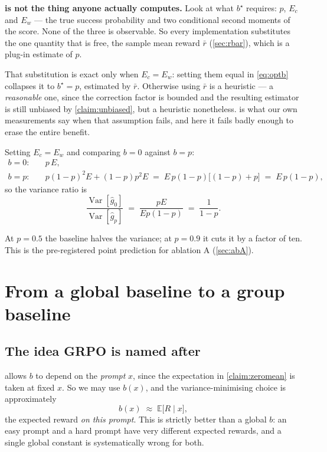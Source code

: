 \documentclass[11pt,letterpaper]{article}
\theoremstyle{definition}
\newcommand{\E}{\mathbb{E}}
\newcommand{\Var}{\operatorname{Var}}
\begin{document}
\begin{aside}
\textbf{ is not the thing anyone actually computes.} Look at what $b^\star$ requires:
$p$, $E_c$ and $E_w$ --- the true success probability and two conditional second moments of the
score. None of the three is observable. So every implementation substitutes the one quantity that is
free, the sample mean reward $\bar{r}$ (\cref{sec:rbar}), which is a plug-in estimate of $p$.

That substitution is exact only when $E_c = E_w$: setting them equal in \cref{eq:optb} collapses it
to $b^\star = p$, estimated by $\bar{r}$. Otherwise using $\bar{r}$ is a heuristic --- a
\emph{reasonable} one, since the correction factor is bounded and the resulting estimator is still
unbiased by \cref{claim:unbiased}, but a heuristic nonetheless.  is what our own
measurements say when that assumption fails, and here it fails badly enough to erase the entire
benefit.
\end{aside}

Setting $E_c = E_w$ and comparing $b = 0$ against $b = p$:
\begin{align}
  b = 0: &\quad p\,E, \\
  b = p: &\quad p(1-p)^2 E + (1-p)p^2 E \;=\; E\,p(1-p)\big[(1-p) + p\big] \;=\; E\,p(1-p),
\end{align}
so the variance ratio is
\begin{equation}
  \boxed{\;\frac{\Var[\hat{g}_0]}{\Var[\hat{g}_p]} \;=\; \frac{p E}{E p (1-p)} \;=\; \frac{1}{1-p}.\;}
  \label{eq:ratio}
\end{equation}

At $p = 0.5$ the baseline halves the variance; at $p = 0.9$ it cuts it by a factor of ten. This is
the pre-registered point prediction for ablation A (\cref{sec:abA}).

\section{From a global baseline to a group baseline}
\label{sec:group}

\subsection{The idea GRPO is named after}

 allows $b$ to depend on the \emph{prompt} $x$, since the expectation in
\cref{claim:zeromean} is taken at fixed $x$. So we may use $b(x)$, and the variance-minimising choice
is approximately
\begin{equation}
  b(x) \;\approx\; \E\big[R \mid x\big],
\end{equation}
the expected reward \emph{on this prompt}. This is strictly better than a global $b$: an easy prompt
and a hard prompt have very different expected rewards, and a single global constant is systematically
wrong for both.
\end{document}
